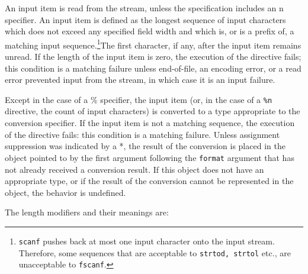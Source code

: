 An input item is read from the stream, unless the specification includes an n
specifier. An input item is defined as the longest sequence of input characters
which does not exceed any specified field width and which is, or is a prefix
of, a matching input sequence.\footnote{\texttt{scanf} pushes back at most one
  input character onto the input stream. Therefore, some sequences that are
  acceptable to \texttt{strtod, strtol} etc., are unacceptable to
  \texttt{fscanf}.}The first character, if any, after the input item remains
unread. If the length of the input item is zero, the execution of the directive
fails; this condition is a matching failure unless end-of-file, an encoding
error, or a read error prevented input from the stream, in which case it is an
input failure.

Except in the case of a \% specifier, the input item (or, in the case of a
\texttt{\%n} directive, the count of input characters) is converted to a type
appropriate to the conversion specifier. If the input item is not a matching
sequence, the execution of the directive fails: this condition is a matching
failure. Unless assignment suppression was indicated by a *, the result of the
conversion is placed in the object pointed to by the first argument following
the \texttt{format} argument that has not already received a conversion
result. If this object does not have an appropriate type, or if the result of
the conversion cannot be represented in the object, the behavior is undefined.

The length modifiers and their meanings are:

